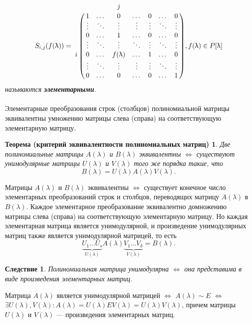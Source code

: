 $$S_{i,j}(f(\lambda)) = \bordermatrix{
	& & & j & & & & \cr
	& 1 & \dots & 0 & \dots & 0 & \dots & 0 \cr
	& \vdots & \ddots & \vdots & \vdots & \vdots & \ddots & \vdots \cr
	& 0 & \dots & 1 & \dots & 0 & \dots & 0 \cr
	& \vdots & \ddots & \vdots & \ddots & \vdots & \ddots & \vdots \cr
	i & 0 & \dots & f(\lambda) & \dots & 1 & \dots & 0 \cr
	& \vdots & \ddots & \vdots & \vdots & \vdots & \ddots & \vdots \cr
	& 0 & \dots & 0 & \dots & 0 & \dots & 1 \cr}, f(\lambda)\in P[\lambda]$$ \textit{называются \textbf{элементарными}.}\\\\
Элементарные преобразования строк (столбцов) полиномиальной матрицы эквивалентны
умножению матрицы слева (справа) на соответствующую элементарную матрицу.
\newtheorem*{th12_4_1}{Теорема (критерий эквивалентности полиномиальных матриц)}\begin{th12_4_1}Две полиномиальные матрицы $A(\lambda)$ и $B(\lambda)$ эквивалентны $\Longleftrightarrow$ существуют унимодулярные матрицы $U(\lambda)$ и $V(\lambda)$ того же порядка такие, что $$B(\lambda) = U(\lambda)A(\lambda)V(\lambda).$$
\end{th12_4_1}\begin{Proof}
	Матрицы $A(\lambda)$ и $B(\lambda)$ эквивалентны $\Longleftrightarrow$ существует конечное число элементарных преобразований строк и столбцов, переводящих матрицу $A(\lambda)$ в $B(\lambda)$. Каждое элементарное преобразование эквивалентно домножению матрицы слева (справа) на соответствующую элементарную матрицу. Но каждая элементарная матрица является унимодулярной, и произведение унимодулярных матриц также является унимодулярной матрицей, то есть $$\underbrace{U_1\dots U_s}_{U(\lambda)}A(\lambda)\underbrace{V_1\dots V_k}_{V(\lambda)}=B(\lambda).$$
\end{Proof}
\newtheorem*{cor12_4_1}{Следствие}\begin{cor12_4_1}Полиномиальная матрица унимодулярна $\Longleftrightarrow$ она представима в виде произведения элементарных матриц.
\end{cor12_4_1}\begin{Proof}
	Матрица $A(\lambda)$ является унимодулярной матрицей $\Longleftrightarrow$ $A(\lambda)\sim E$ $\Longleftrightarrow$ $\exists U(\lambda), V(\lambda): A(\lambda) = U(\lambda)EV(\lambda) = U(\lambda)V(\lambda)$, причем матрицы $U(\lambda)$ и $V(\lambda)$ --- произведения элементарных матриц.
\end{Proof} 












